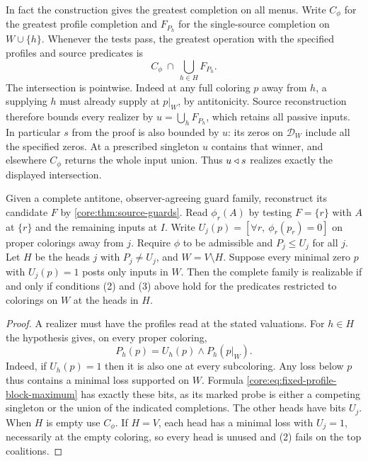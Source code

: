 In fact the construction gives the greatest completion on all menus.
Write $C_\phi$ for the greatest profile completion and $F_{P_h}$ for
the single-source completion on $W\cup\{h\}$. Whenever the tests pass,
the greatest operation with the specified profiles and source predicates is
\begin{equation}\label{core:eq:fixed-profile-block-maximum}
                 C_\phi\ \cap\ \bigcup_{h\in H} F_{P_h}.
\end{equation}
The intersection is pointwise. Indeed at any full coloring $p$ away
from $h$, a supplying $h$ must already supply at $p|_W$, by
antitonicity. Source reconstruction therefore bounds every realizer by
$u=\bigcup_hF_{P_h}$, which retains all passive inputs. In particular
$s$ from the proof is also bounded by $u$: its zeros on $\mathcal D_W$
include all the specified zeros. At a prescribed singleton $u$ contains
that winner, and elsewhere $C_\phi$ returns the whole input union.
Thus $u\mathbin{\triangleleft} s$ realizes exactly the displayed intersection.

\begin{corollary}
\label{core:cor:profile-residual-guards}
Given a complete antitone, observer-agreeing guard family, reconstruct
its candidate $F$ by \cref{core:thm:source-guards}. Read $\phi_r(A)$
by testing $F=\{r\}$ with $A$ at $\{r\}$ and the remaining inputs at
$I$. Write $U_j(p)=[\forall r,\ \phi_r(p_r)=0]$ on proper colorings
away from $j$. Require $\phi$ to be admissible and $P_j\le U_j$ for
all $j$. Let $H$ be the heads $j$ with $P_j\ne U_j$, and
$W=V\setminus H$. Suppose every minimal zero $p$ with $U_j(p)=1$
posts only inputs in $W$. Then the complete family is realizable
if and only if conditions (2) and (3) above hold for the predicates
restricted to colorings on $W$ at the heads in $H$.
\end{corollary}
\begin{proof}
A realizer must have the profiles read at the stated valuations.
For $h\in H$ the hypothesis gives, on every proper coloring,
\[
                 P_h(p)=U_h(p)\land P_h(p|_W).
\]
Indeed, if $U_h(p)=1$ then it is also one at every subcoloring. Any
loss below $p$ thus contains a minimal loss supported on $W$.
Formula \eqref{core:eq:fixed-profile-block-maximum} has exactly these
bits, as its marked probe is either a competing singleton or the union
of the indicated completions. The other heads have bits $U_j$.
When $H$ is empty use $C_\phi$. If $H=V$, each head has a minimal
loss with $U_j=1$, necessarily at the empty coloring, so every head
is unused and (2) fails on the top coalitions.
\end{proof}

